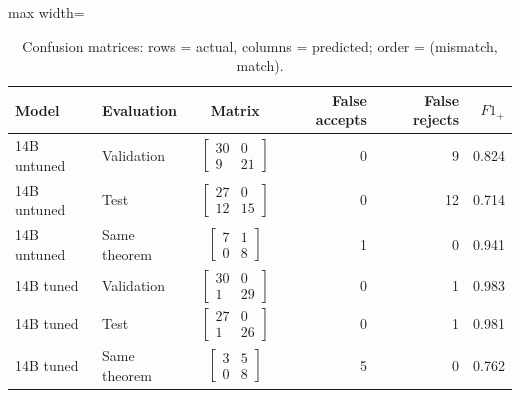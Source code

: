 \begin{table}[htbp]
\centering
\caption{Confusion matrices: rows = actual, columns = predicted; order = (mismatch, match).}
\label{tab:related-swap-confusion}
\small
\begin{adjustbox}{max width=\textwidth}
\begin{tabular}{llcrrr}
\toprule
Model & Evaluation & Matrix & False accepts & False rejects & $F1_+$ \\
\midrule
14B untuned & Validation & $\left[\begin{array}{rr}30&0\\9&21\end{array}\right]$ & 0 & 9 & 0.824 \\
14B untuned & Test & $\left[\begin{array}{rr}27&0\\12&15\end{array}\right]$ & 0 & 12 & 0.714 \\
14B untuned & Same theorem & $\left[\begin{array}{rr}7&1\\0&8\end{array}\right]$ & 1 & 0 & 0.941 \\
14B tuned & Validation & $\left[\begin{array}{rr}30&0\\1&29\end{array}\right]$ & 0 & 1 & 0.983 \\
14B tuned & Test & $\left[\begin{array}{rr}27&0\\1&26\end{array}\right]$ & 0 & 1 & 0.981 \\
14B tuned & Same theorem & $\left[\begin{array}{rr}3&5\\0&8\end{array}\right]$ & 5 & 0 & 0.762 \\
\bottomrule
\end{tabular}
\end{adjustbox}
\end{table}

